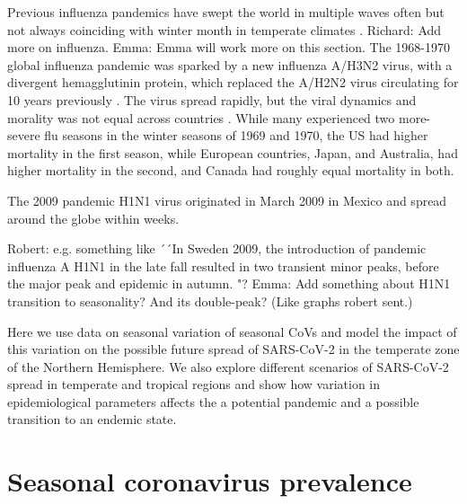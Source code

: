 \documentclass[rmp, reprint, superscriptaddress, floatfix,amsmath]{revtex4-1}
\newcommand{\Richard}[1]{{\color{drab}Richard: #1}}
\newcommand{\Robert}[1]{{\color{celestialblue}Robert: #1}}
\newcommand{\Emma}[1]{{\color{purple}Emma: #1}}
\begin{document}

Previous influenza pandemics have swept the world in multiple waves often but not always coinciding with winter month in temperate climates \citep{taubenberger_1918_2019,viboud_multinational_2005,viboud_global_2016}. 
\Richard{Add more on influenza}. \Emma{Emma will work more on this section.}
The 1968-1970 global influenza pandemic was sparked by a new influenza A/H3N2 virus, with a divergent hemagglutinin protein, which replaced the A/H2N2 virus circulating for 10 years previously \citep{viboud_multinational_2005}. The virus spread rapidly, but the viral dynamics and morality was not equal across countries \citep{viboud_multinational_2005}. While many experienced two more-severe flu seasons in the winter seasons of 1969 and 1970, the US had higher mortality in the first season, while European countries, Japan, and Australia, had higher mortality in the second, and Canada had roughly equal mortality in both.

The 2009 pandemic H1N1 virus originated in March 2009 in Mexico and spread around the globe within weeks.

\Robert{e.g. something like ´´In Sweden 2009, the introduction of pandemic influenza A H1N1 in the late fall resulted in two transient minor peaks, before the major peak and epidemic in autumn. \citep{SMI2011}"?}
\Emma{Add something about H1N1 transition to seasonality? And its double-peak? (Like graphs robert sent.)}

Here we use data on seasonal variation of seasonal CoVs and model the impact of this variation on the possible future spread of SARS-CoV-2 in the temperate zone of the Northern Hemisphere. 
We also explore different scenarios of SARS-CoV-2 spread in temperate and tropical regions and show how variation in epidemiological parameters affects the a potential pandemic and a possible transition to an endemic state. 

\section{Seasonal coronavirus prevalence} 
\end{document}
